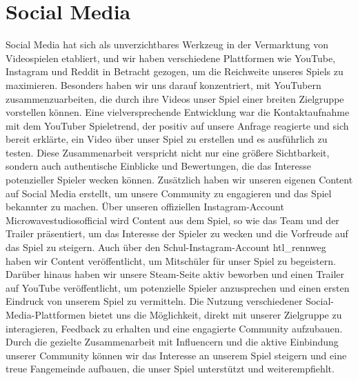 
\section{Social Media}\label{sec:social-media}

\renewcommand{\kapitelautor}{Autor: Nils Hubmann}


%
Social Media hat sich als unverzichtbares Werkzeug in der Vermarktung von Videospielen etabliert, und wir haben verschiedene Plattformen wie YouTube, Instagram und Reddit in Betracht gezogen, um die Reichweite unseres Spiels zu maximieren.
Besonders haben wir uns darauf konzentriert, mit YouTubern zusammenzuarbeiten, die durch ihre Videos unser Spiel einer breiten Zielgruppe vorstellen können.
Eine vielversprechende Entwicklung war die Kontaktaufnahme mit dem YouTuber Spieletrend, der positiv auf unsere Anfrage reagierte und sich bereit erklärte, ein Video über unser Spiel zu erstellen und es ausführlich zu testen. Diese Zusammenarbeit verspricht nicht nur eine größere Sichtbarkeit, sondern auch authentische Einblicke und Bewertungen, die das Interesse potenzieller Spieler wecken können.
Zusätzlich haben wir unseren eigenen Content auf Social Media erstellt, um unsere Community zu engagieren und das Spiel bekannter zu machen.
Über unseren offiziellen Instagram-Account Microwavestudiosofficial wird Content aus dem Spiel, so wie das Team und der Trailer präsentiert, um das Interesse der Spieler zu wecken und die Vorfreude auf das Spiel zu steigern.
Auch über den Schul-Instagram-Account htl\_rennweg haben wir Content veröffentlicht, um Mitschüler für unser Spiel zu begeistern.
Darüber hinaus haben wir unsere Steam-Seite aktiv beworben und einen Trailer auf YouTube veröffentlicht, um potenzielle Spieler anzusprechen und einen ersten Eindruck von unserem Spiel zu vermitteln.
Die Nutzung verschiedener Social-Media-Plattformen bietet uns die Möglichkeit, direkt mit unserer Zielgruppe zu interagieren, Feedback zu erhalten und eine engagierte Community aufzubauen.
Durch die gezielte Zusammenarbeit mit Influencern und die aktive Einbindung unserer Community können wir das Interesse an unserem Spiel steigern und eine treue Fangemeinde aufbauen, die unser Spiel unterstützt und weiterempfiehlt.
%

\renewcommand{\kapitelautor}{}

